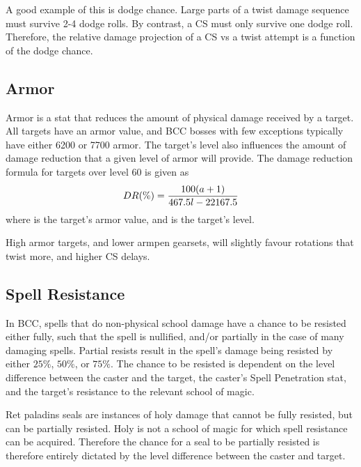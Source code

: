 \documentclass[letterpaper,11pt]{article}
\begin{document}
	A good example of this is dodge chance.
	Large parts of a twist damage sequence must survive 2-4 dodge rolls.
	By contrast, a CS must only survive one dodge roll.
	Therefore, the relative damage projection of a CS vs a twist attempt is a function of the dodge chance.
	
	\subsection{Armor}
	Armor is a stat that reduces the amount of physical damage received by a target.
	All targets have an armor value, and BCC bosses with few exceptions typically have either 6200 or 7700 armor.
	The target's level also influences the amount of damage reduction that a given level of armor will provide.
	The damage reduction formula for targets over level 60 is given as
	\begin{equation}
		DR(\%)  = \frac{100(a + 1)}{467.5 l -22167.5}
	\end{equation}
	where \armor is the target's armor value, and \lvl is the target's level.

	High armor targets, and lower armpen gearsets, will slightly favour rotations that twist more, and higher CS delays.	
	
	
	\subsection{Spell Resistance}
	In BCC, spells that do non-physical school damage have a chance to be resisted either fully, such that the spell is nullified, and/or partially in the case of many damaging spells.
	Partial resists result in the spell's damage being resisted by either $25\%$, $50\%$, or $75\%$.
	The chance to be resisted is dependent on the level difference between the caster and the target, the caster's Spell Penetration stat, and the target's resistance to the relevant school of magic.
	
	Ret paladins seals are instances of holy damage that cannot be fully resisted, but can be partially resisted.
	Holy is not a school of magic for which spell resistance can be acquired.
	Therefore the chance for a seal to be partially resisted is therefore entirely dictated by the level difference between the caster and target.
	
\end{document}
